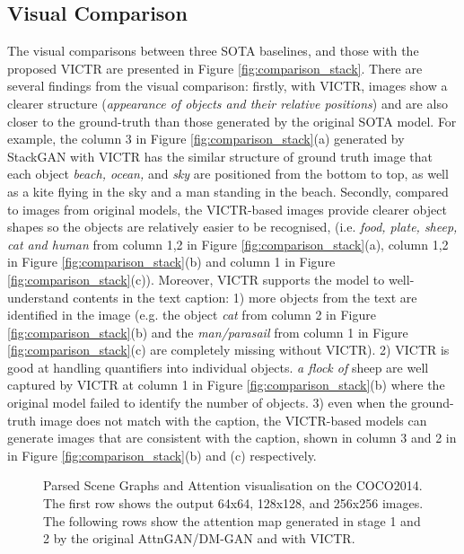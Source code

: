 \documentclass[11pt]{article}
\begin{document}
\subsection{Visual Comparison}
The visual comparisons between three SOTA baselines, and those with the proposed VICTR are presented in Figure \ref{fig:comparison_stack}. There are several findings from the visual comparison: firstly, with VICTR, images show a clearer structure (\textit{appearance of objects and their relative positions}) and are also closer to the ground-truth than those generated by the original SOTA model. For example, the column 3 in Figure \ref{fig:comparison_stack}(a) generated by StackGAN with VICTR has the similar structure of ground truth image that each object \textit{beach, ocean,} and \textit{sky} are positioned from the bottom to top, as well as a kite flying in the sky and a man standing in the beach. Secondly, compared to images from original models, the VICTR-based images provide clearer object shapes so the objects are relatively easier to be recognised, (i.e. \textit{food, plate, sheep, cat and human} from column 1,2 in Figure \ref{fig:comparison_stack}(a), column 1,2 in Figure \ref{fig:comparison_stack}(b) and column 1 in Figure \ref{fig:comparison_stack}(c)). Moreover, VICTR supports the model to well-understand contents in the text caption: 1) more objects from the text are identified in the image (e.g. the object \textit{cat} from column 2 in Figure \ref{fig:comparison_stack}(b) and the \textit{man/parasail} from column 1 in Figure \ref{fig:comparison_stack}(c) are completely missing without VICTR). 2) VICTR is good at handling quantifiers into individual objects. \textit{a flock of} sheep are well captured by VICTR at column 1 in Figure \ref{fig:comparison_stack}(b) where the original model failed to identify the number of objects. 3) even when the ground-truth image does not match with the caption, the VICTR-based models can generate images that are consistent with the caption, shown in column 3 and 2 in in Figure \ref{fig:comparison_stack}(b) and (c) respectively. 




\begin{figure*}[]
\centering
\label{fig:3stage_a}
\label{fig:3stage_b}
  \caption{Parsed Scene Graphs and Attention visualisation on the COCO2014. The first row shows the output 64x64, 128x128, and 256x256 images. The following rows show the attention map generated in stage 1 and 2 by the original AttnGAN/DM-GAN and with VICTR.}
  \label{fig:ATTN_attnmap}
\end{figure*}
\end{document}
